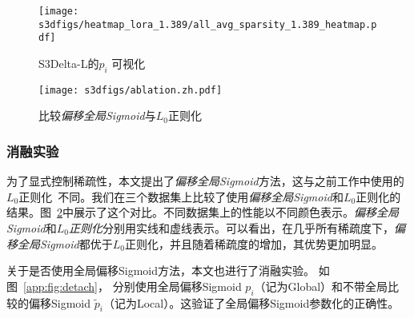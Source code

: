 \begin{figure}[!htbp]
    \centering
    \texttt{[image: s3dfigs/heatmap\_lora\_1.389/all\_avg\_sparsity\_1.389\_heatmap.pdf]} 
    \caption{S3Delta-L的$p_{i}$ 可视化}
    \label{fig:vis-delta2}
\end{figure}


\begin{figure}
       \centering
       \texttt{[image: s3dfigs/ablation.zh.pdf]}
       \caption{比较\emph{偏移全局Sigmoid}与$L_0$正则化}
       \label{fig:ablation}
\end{figure}

\subsubsection{消融实验}

为了显式控制稀疏性，本文提出了\emph{偏移全局Sigmoid}方法，这与之前工作中使用的$L_0$正则化~\cite{louizos2017learning}不同。我们在三个数据集上比较了使用\emph{偏移全局Sigmoid}和$L_0$正则化的结果。图~\ref{fig:ablation}中展示了这个对比。不同数据集上的性能以不同颜色表示。\emph{偏移全局Sigmoid}和\emph{$L_0$正则化}分别用实线和虚线表示。可以看出，在几乎所有稀疏度下，\emph{偏移全局Sigmoid}都优于$L_0$正则化，并且随着稀疏度的增加，其优势更加明显。


关于是否使用全局偏移Sigmoid方法，本文也进行了消融实验。 如图~\ref{app:fig:detach}， 分别使用全局偏移Sigmoid $p_i$（记为Global）和不带全局比较的偏移Sigmoid $\tilde{p}_i$（记为Local）。这验证了全局偏移Sigmoid参数化的正确性。



